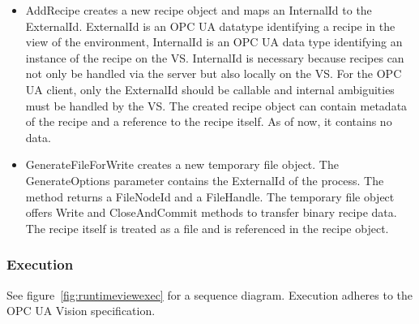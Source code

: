     \begin{itemize}
        \item AddRecipe creates a new recipe object and maps an InternalId to the ExternalId. ExternalId is an OPC UA datatype identifying a recipe in the view of the environment, InternalId is an OPC UA data type identifying an instance of the recipe on the VS.  InternalId is necessary because recipes can not only be handled via the server but also locally on the VS. For the OPC UA client, only the ExternalId should be callable and internal ambiguities must be handled by the VS. The created recipe object can contain metadata of the recipe and a reference to the recipe itself. As of now, it contains no data.
    	\item GenerateFileForWrite creates a new temporary file object. The GenerateOptions parameter contains the ExternalId of the process. The method returns a FileNodeId and a FileHandle. The temporary file object offers Write and CloseAndCommit methods to transfer binary recipe data. The recipe itself is treated as a file and is referenced in the recipe object.
    \end{itemize}
\subsubsection{Execution}
See figure~\ref{fig:runtimeviewexec} for a sequence diagram. Execution adheres to the OPC UA Vision specification.
    
